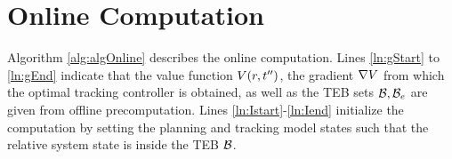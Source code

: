\section{Online Computation \label{sec:online}}
Algorithm \ref{alg:algOnline} describes the online computation. 
Lines \ref{ln:gStart} to \ref{ln:gEnd} indicate that the value function $V(r,t'')$, the gradient $\nabla V$ from which the optimal tracking controller is obtained, as well as the TEB sets $\mathcal B,\mathcal B_e$ are given from offline precomputation. 
Lines \ref{ln:Istart}-\ref{ln:Iend} initialize the computation by setting the planning and tracking model states such that the relative system state is inside the TEB $\mathcal B$. 

